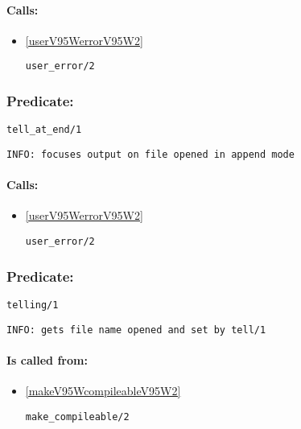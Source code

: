\paragraph{Calls:} 
\begin{itemize}
\item \ref{userV95WerrorV95W2} 
\begin{verbatim}
user_error/2
\end{verbatim}

\end{itemize}

\subsubsection{Predicate:} \label{tellV95WatV95WendV95W1}

\begin{verbatim}
tell_at_end/1
\end{verbatim}

{\small \begin{verbatim}
INFO: focuses output on file opened in append mode

\end{verbatim}}
\paragraph{Calls:} 
\begin{itemize}
\item \ref{userV95WerrorV95W2} 
\begin{verbatim}
user_error/2
\end{verbatim}

\end{itemize}

\subsubsection{Predicate:} \label{tellingV95W1}

\begin{verbatim}
telling/1
\end{verbatim}

{\small \begin{verbatim}
INFO: gets file name opened and set by tell/1

\end{verbatim}}
\paragraph{Is called from:} 
\begin{itemize}
\item \ref{makeV95WcompileableV95W2} 
\begin{verbatim}
make_compileable/2
\end{verbatim}

\end{itemize}

